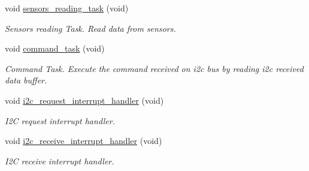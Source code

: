 \begin{DoxyCompactItemize}
void \hyperlink{i2c-th_8h_af0e8965583b124096972fe3a9e0e7954}{sensors\+\_\+reading\+\_\+task} (void)
\begin{DoxyCompactList}\small\item\em Sensors reading Task. Read data from sensors. \end{DoxyCompactList}\item 
void \hyperlink{i2c-th_8h_a9f32a4169471a435e9364460d7b1761d}{command\+\_\+task} (void)
\begin{DoxyCompactList}\small\item\em Command Task. Execute the command received on i2c bus by reading i2c received data buffer. \end{DoxyCompactList}\item 
void \hyperlink{i2c-th_8h_ac1da31566bf05976ecb87372278a1ea8}{i2c\+\_\+request\+\_\+interrupt\+\_\+handler} (void)
\begin{DoxyCompactList}\small\item\em I2C request interrupt handler. \end{DoxyCompactList}\item 
void \hyperlink{i2c-th_8h_a7f81fcf39717baf18f2e7c2eee2051ae}{i2c\+\_\+receive\+\_\+interrupt\+\_\+handler} (void)
\begin{DoxyCompactList}\small\item\em I2C receive interrupt handler. \end{DoxyCompactList}\end{DoxyCompactItemize}
